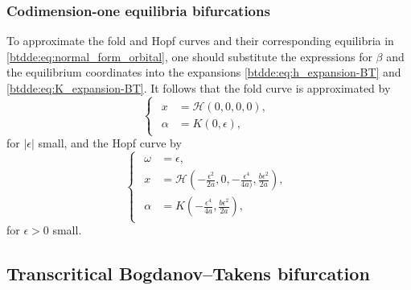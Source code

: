 \subsubsection{Codimension-one equilibria bifurcations}
To approximate the fold and Hopf curves and their corresponding equilibria in
\cref{btdde:eq:normal_form_orbital}, one should substitute the expressions for $\beta$
and the equilibrium coordinates into the expansions \cref{btdde:eq:h_expansion-BT} and
\cref{btdde:eq:K_expansion-BT}. It follows that the fold curve is approximated by 
\begin{equation*}
\begin{cases}
\begin{aligned}
    x &= \mathcal H\left(0,0,0,0\right), \\
    \alpha &= K(0,\epsilon),
\end{aligned}
\end{cases}
\end{equation*}
for $|\epsilon|$ small, and the Hopf curve by
\begin{equation*}
\begin{cases}
\begin{aligned}
    \omega &= \epsilon, \\
    x &= \mathcal H\left(-\frac{\epsilon^2}{2a},0,-\frac{\epsilon^4}{4a)},\frac{b\epsilon^2}{2a}\right), \\
    \alpha &= K\left(-\frac{\epsilon^4}{4a},\frac{b\epsilon^2}{2a}\right),
\end{aligned}
\end{cases}
\end{equation*}
for $\epsilon > 0$ small.

\subsection{Transcritical Bogdanov--Takens bifurcation}
\label{btdde:sec:transcritical-Bogdanov-Takens}

